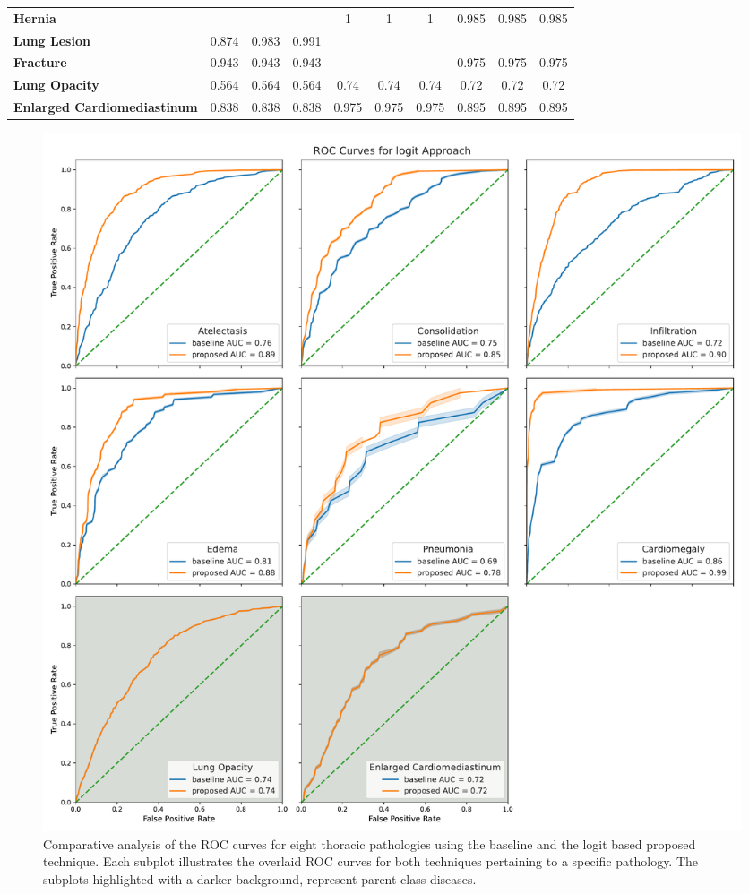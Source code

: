 \documentclass[preprint,3p,times, review]{elsarticle}
\begin{document}
\begin{table}[]
{\begin{tabular}{lccccccccc}
\textbf{Hernia}              &       &       &       & 1     & 1     & 1     & 0.985 & 0.985 & 0.985 \\
\textbf{Lung Lesion}         & 0.874 & 0.983 & 0.991 &       &       &       &       &       &       \\
\textbf{Fracture}            & 0.943 & 0.943 & 0.943 &       &       &       & 0.975 & 0.975 & 0.975 \\
\textbf{Lung Opacity}        & 0.564 & 0.564 & 0.564 & 0.74  & 0.74  & 0.74  & 0.72  & 0.72  & 0.72  \\
\textbf{Enlarged   Cardiomediastinum} & 0.838 & 0.838 & 0.838 & 0.975 & 0.975 & 0.975 & 0.895 & 0.895 & 0.895
\end{tabular}%
}\label{Taxonomy.Table.ACC_default}
\end{table}



\begin{figure}[htbp]
    \centering
    \includegraphics[width=\textwidth]{figures/roc_curve/default_NIH_logit/roc_curve_NIH_logit_default.pdf}%
    \caption{Comparative analysis of the ROC curves for eight thoracic pathologies using the baseline and the logit based proposed technique. Each subplot illustrates the overlaid ROC curves for both techniques pertaining to a specific pathology. The subplots highlighted with a darker background, represent parent class diseases.}%
    \label{Taxonomy.Fig.2.roc_curve_NIH_logit_default}
\end{figure}
\end{document}
